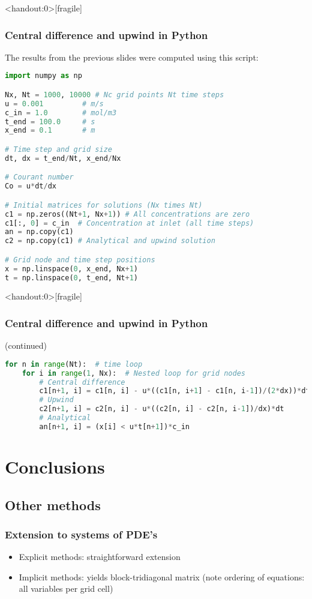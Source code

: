 \begin{frame}<handout:0>[fragile]
  \frametitle{Central difference and upwind in Python}
  \footnotesize\selectfont
  The results from the previous slides were computed using this script:
  \begin{lstlisting}[language=Python, basicstyle=\scriptsize\ttfamily,]
import numpy as np

Nx, Nt = 1000, 10000 # Nc grid points Nt time steps
u = 0.001         # m/s
c_in = 1.0        # mol/m3
t_end = 100.0     # s
x_end = 0.1       # m

# Time step and grid size
dt, dx = t_end/Nt, x_end/Nx

# Courant number
Co = u*dt/dx

# Initial matrices for solutions (Nx times Nt)
c1 = np.zeros((Nt+1, Nx+1)) # All concentrations are zero
c1[:, 0] = c_in  # Concentration at inlet (all time steps)
an = np.copy(c1) 
c2 = np.copy(c1) # Analytical and upwind solution

# Grid node and time step positions
x = np.linspace(0, x_end, Nx+1)
t = np.linspace(0, t_end, Nt+1)
\end{lstlisting}
\end{frame}

\begin{frame}<handout:0>[fragile]
  \frametitle{Central difference and upwind in Python}
  \footnotesize\selectfont
  (continued)
\begin{lstlisting}[language=Python, basicstyle=\scriptsize\ttfamily,]
for n in range(Nt):  # time loop
    for i in range(1, Nx):  # Nested loop for grid nodes
        # Central difference
        c1[n+1, i] = c1[n, i] - u*((c1[n, i+1] - c1[n, i-1])/(2*dx))*dt
        # Upwind
        c2[n+1, i] = c2[n, i] - u*((c2[n, i] - c2[n, i-1])/dx)*dt
        # Analytical
        an[n+1, i] = (x[i] < u*t[n+1])*c_in
\end{lstlisting}
\end{frame}


\section{Conclusions}
\subsection{Other methods}
\begin{frame}
  \frametitle{Extension to systems of PDE's}
  \begin{itemize}
    \item Explicit methods: straightforward extension
    \item Implicit methods: yields block-tridiagonal matrix (note ordering of equations: all variables per grid cell)
  \end{itemize}
\end{frame}

